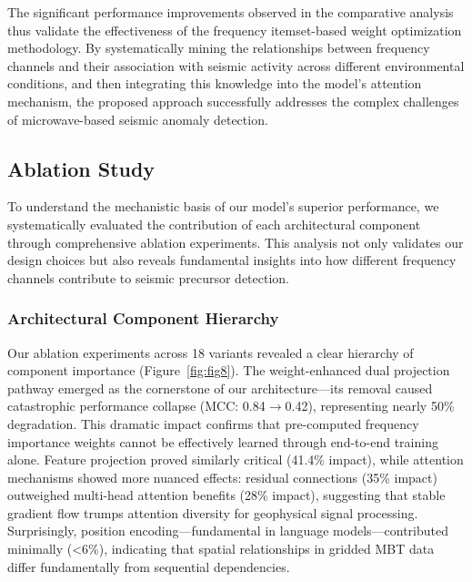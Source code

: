 \documentclass[preprint,review,12pt,authoryear]{elsarticle}
\begin{document}
The significant performance improvements observed in the comparative analysis thus validate the effectiveness of the frequency itemset-based weight optimization methodology. By systematically mining the relationships between frequency channels and their association with seismic activity across different environmental conditions, and then integrating this knowledge into the model's attention mechanism, the proposed approach successfully addresses the complex challenges of microwave-based seismic anomaly detection.


\subsection{Ablation Study}
To understand the mechanistic basis of our model's superior performance, we systematically evaluated the contribution of each architectural component through comprehensive ablation experiments. This analysis not only validates our design choices but also reveals fundamental insights into how different frequency channels contribute to seismic precursor detection.

\subsubsection{Architectural Component Hierarchy}
Our ablation experiments across 18 variants revealed a clear hierarchy of component importance (Figure~\ref{fig:fig8}). The weight-enhanced dual projection pathway emerged as the cornerstone of our architecture---its removal caused catastrophic performance collapse (MCC: 0.84$\rightarrow$0.42), representing nearly 50\% degradation. This dramatic impact confirms that pre-computed frequency importance weights cannot be effectively learned through end-to-end training alone. Feature projection proved similarly critical (41.4\% impact), while attention mechanisms showed more nuanced effects: residual connections (35\% impact) outweighed multi-head attention benefits (28\% impact), suggesting that stable gradient flow trumps attention diversity for geophysical signal processing. Surprisingly, position encoding---fundamental in language models---contributed minimally (<6\%), indicating that spatial relationships in gridded MBT data differ fundamentally from sequential dependencies.
\end{document}
